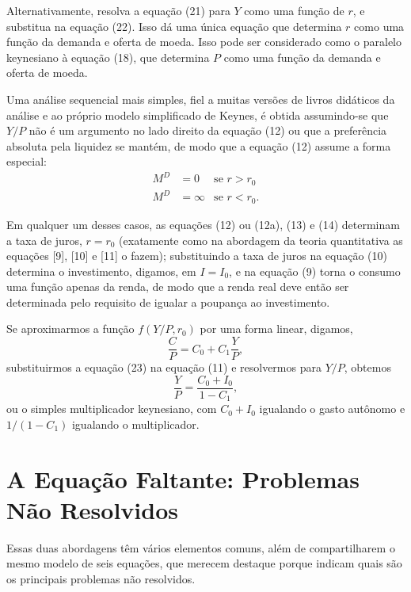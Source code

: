 \documentclass[12pt]{article}
\begin{document}
Alternativamente, resolva a equação (21) para $Y$ como uma função de $r$, e substitua na equação (22). Isso dá uma única equação que determina $r$ como uma função da demanda e oferta de moeda. Isso pode ser considerado como o paralelo keynesiano à equação (18), que determina $P$ como uma função da demanda e oferta de moeda.

Uma análise sequencial mais simples, fiel a muitas versões de livros didáticos da análise e ao próprio modelo simplificado de Keynes, é obtida assumindo-se que $Y/P$ não é um argumento no lado direito da equação (12) ou que a preferência absoluta pela liquidez se mantém, de modo que a equação (12) assume a forma especial:
\begin{equation}
\begin{aligned}
M^D &= 0 & \text{se } r > r_0 \\
M^D &= \infty & \text{se } r < r_0.
\end{aligned}
\tag{12a}
\end{equation}

Em qualquer um desses casos, as equações (12) ou (12a), (13) e (14) determinam a taxa de juros, $r = r_0$ (exatamente como na abordagem da teoria quantitativa as equações [9], [10] e [11] o fazem); substituindo a taxa de juros na equação (10) determina o investimento, digamos, em $I = I_0$, e na equação (9) torna o consumo uma função apenas da renda, de modo que a renda real deve então ser determinada pelo requisito de igualar a poupança ao investimento.

Se aproximarmos a função $f(Y/P, r_0)$ por uma forma linear, digamos,
\begin{equation}
\frac{C}{P} = C_0 + C_1 \frac{Y}{P},
\end{equation}
substituirmos a equação (23) na equação (11) e resolvermos para $Y/P$, obtemos
\begin{equation}
\frac{Y}{P} = \frac{C_0 + I_0}{1 - C_1},
\end{equation}
ou o simples multiplicador keynesiano, com $C_0 + I_0$ igualando o gasto autônomo e $1/(1 - C_1)$ igualando o multiplicador.

\section{A Equação Faltante: Problemas Não Resolvidos}

Essas duas abordagens têm vários elementos comuns, além de compartilharem o mesmo modelo de seis equações, que merecem destaque porque indicam quais são os principais problemas não resolvidos.
\end{document}
